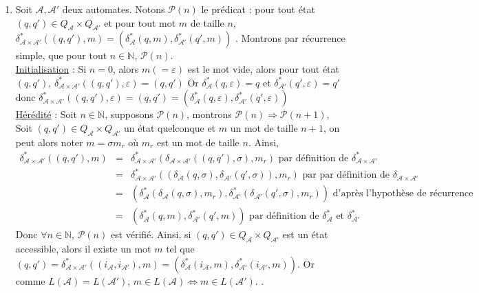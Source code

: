 \documentclass{article}
\newcommand{\bb}[1]{\mathbb{#1}}
\begin{document}
\begin{enumerate}
    \item \label{itm:rec2} Soit $\mathcal{A}, \mathcal{A}'$ deux automates. \sloppy \newline
    Notons $\mathcal{P}(n)$ le prédicat : \og pour tout état $(q, q') \in Q_\mathcal{A} \times Q_{\mathcal{A}'}$ et pour tout mot $m$ de taille $n$, $\delta_{\mathcal{A} \times \mathcal{A}'}^*((q, q'), m) = (\delta_\mathcal{A}^*(q, m),\delta_{\mathcal{A}'}^*(q', m))$ \fg. Montrons par récurrence simple, que pour tout $n \in \bb{N}$, $\mathcal{P}(n)$. \\[2mm] 
    \underline{Initialisation} : Si $n = 0$, alors $m (= \varepsilon)$ est le mot vide, alors pour tout état $(q, q')$, $\delta_{\mathcal{A} \times \mathcal{A}'}^*((q, q'), \varepsilon) = (q, q')$ \newline 
    Or $\delta_\mathcal{A}^*(q, \varepsilon) = q$ et $\delta_{\mathcal{A}'}^*(q', \varepsilon) = q'$ donc $\delta_{\mathcal{A} \times \mathcal{A}'}^*((q, q'), \varepsilon) = (q, q') = (\delta_\mathcal{A}^*(q, \varepsilon), \delta_{\mathcal{A}'}^*(q', \varepsilon))$ \\[2mm]
    \underline{Hérédité} : Soit $n \in \bb{N}$, supposons $\mathcal{P}(n)$, montrons $\mathcal{P}(n) \Rightarrow \mathcal{P}(n + 1)$, \newline
    Soit $(q, q') \in Q_\mathcal{A} \times Q_{\mathcal{A}'}$ un état quelconque et $m$ un mot de taille $n + 1$, on peut alors noter $m = \sigma m_r$ où $m_r$ est un mot de taille $n$. Ainsi, \begin{eqnarray*}
        \delta_{\mathcal{A} \times \mathcal{A}'}^*((q, q'), m) & = & \delta_{\mathcal{A} \times \mathcal{A}'}^*(\delta_{\mathcal{A} \times \mathcal{A}'}((q, q'), \sigma), m_r) \text{ par définition de } \delta_{\mathcal{A} \times \mathcal{A}'}^* \\
        & = & \delta_{\mathcal{A} \times \mathcal{A}'}^*((\delta_\mathcal{A}(q, \sigma),\delta_{\mathcal{A}'}(q', \sigma)), m_r) \text{ par par définition de } \delta_{\mathcal{A} \times \mathcal{A}'} \\
        & = & (\delta_\mathcal{A}^*(\delta_\mathcal{A}(q, \sigma), m_r),\delta_{\mathcal{A}'}^*(\delta_{\mathcal{A}'}(q', \sigma), m_r)) \text{ d'après l'hypothèse de récurrence} \\
        & = & (\delta_\mathcal{A}^*(q, m),\delta_{\mathcal{A}'}^*(q',  m)) \text{ par définition de $\delta_\mathcal{A}^*$ et $\delta_{\mathcal{A}'}^*$}
    \end{eqnarray*}
    Donc $\forall n \in \bb{N}$, $\mathcal{P}(n)$ est vérifié. \newline
    Ainsi, si $(q, q') \in Q_\mathcal{A} \times Q_{\mathcal{A}'}$ est un état accessible, alors il existe un mot $m$ tel que $(q, q') = \delta_{\mathcal{A} \times \mathcal{A}'}^*((i_\mathcal{A}, i_{\mathcal{A}'}), m) = (\delta_\mathcal{A}^*(i_\mathcal{A}, m),\delta_{\mathcal{A}'}^*(i_\mathcal{A'}, m))$.\newline 
    Or comme $L(\mathcal{A}) = L(\mathcal{A}')$, $m \in L(\mathcal{A}) \Longleftrightarrow  m \in L(\mathcal{A'})$.  .


\end{enumerate}
\end{document}
